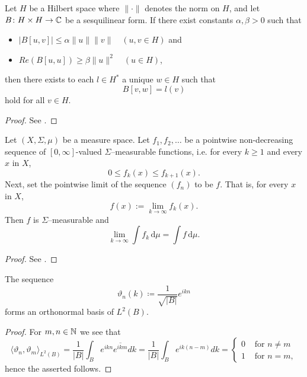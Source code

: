 \begin{atheorem}
	Let $H$ be a Hilbert space where $\| \cdot \|$ denotes the norm on $H$, and let $B \colon H \times H \rightarrow \mathbb{C}$ be a sesquilinear form. If there exist constants $\alpha, \beta > 0$ such that
	\begin{itemize}
		\item $\left| B[u, v] \right| \leq \alpha \| u \| \|v \| \quad (u, v \in H)$ and
		\item $Re(B[u,u]) \geq \beta \|u\|^{2} \quad (u \in H)$,
	\end{itemize}
	then there exists to each $l \in H^{*}$ a unique $w \in H$ such that
		\[ B[v, w] = l(v) \]
	hold for all $v \in H$.
		
	\begin{proof}
		See \cite[Amd to problem 51]{plum2015dglhr}.
	\end{proof}
\end{atheorem}

\begin{atheorem}
	Let $(X, \Sigma, \mu)$ be a measure space. Let $f_1, f_2, \ldots$  be a pointwise non-decreasing sequence of $[0, \infty]$-valued $\Sigma$–measurable functions, i.e. for every $k \geq 1$ and every $x$ in $X$,
		\[ 0 \leq f_k(x) \leq f_{k+1}(x). \] 
	Next, set the pointwise limit of the sequence $(f_{n})$ to be $f$. That is, for every $x$ in $X$,
		\[ f(x):= \lim_{k\to\infty} f_k(x). \]
	Then $f$ is $\Sigma$–measurable and
		\[ \lim_{k\to\infty} \int f_k \, \mathrm{d}\mu = \int f \, \mathrm{d}\mu. \]

	\begin{proof}
		See \cite[p. 516]{werner2006funkana}.
	\end{proof}
\end{atheorem}

\begin{atheorem}
	The sequence
		\[ \vartheta_{n}(k) \coloneqq \frac{1}{\sqrt{|B|}} e^{ikn} \]
	forms an orthonormal basis of $L^{2}(B)$.

	\begin{proof}
		 For $m, n \in \mathbb{N}$ we see that
		 \[ \langle \vartheta_{n}, \vartheta_{m} \rangle_{L^{2}(B)} = \frac{1}{|B|} \int_{B} e^{ikn} \overline{e^{ikm}} dk = \frac{1}{|B|} \int_{B} e^{ik(n-m)} dk = \begin{cases} 0 & \text{ for } n \neq m \\ 1 & \text{ for } n = m, \end{cases} \]
		 hence the asserted follows.
	\end{proof}
\end{atheorem}

